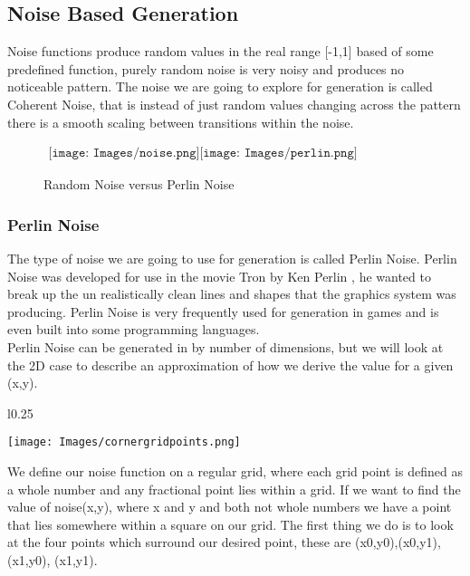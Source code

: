 \subsection{Noise Based Generation}
Noise functions produce random values in the real range [-1,1] based of some 
predefined function, purely random noise is very noisy and produces no noticeable
pattern. The noise we are going to explore for generation is called Coherent
Noise, that is instead of just random values changing across the pattern there 
is a smooth scaling between transitions within the noise.\\

\begin{figure}[h!]
	\begin{center}$
		\begin{array}{cc}
			\texttt{[image: Images/noise.png]}
			\texttt{[image: Images/perlin.png]}
		\end{array}$
	\end{center}
	\caption{Random Noise versus Perlin Noise}
\end{figure}
\newpage

\subsubsection*{Perlin Noise}
The type of noise we are going to use for generation is called Perlin Noise. 
Perlin Noise was developed for use in the movie Tron by Ken Perlin\cite{KenPerlin}
, he wanted to
break up the un realistically clean lines and shapes that the graphics system was
producing. Perlin Noise is very frequently used for generation in games and is 
even built into some programming languages.\\

Perlin Noise\cite{PerlinFAQ} can be generated in by number of dimensions, 
but we will look at the
2D case to describe an approximation of how we derive the value for a given 
(x,y).\\
\begin{wrapfigure}{l}{0.25\textwidth}
	\begin{center}
			\texttt{[image: Images/cornergridpoints.png]}
	\end{center}
\end{wrapfigure}

We define our noise function on a regular grid, where each grid point is defined as
a whole number and any fractional point lies within a grid. If we want to find the
value of noise(x,y), where x and y and both not whole numbers we have a point that
lies somewhere within a square on our grid. The first thing we do is to look at the
four points which surround our desired point, these are (x0,y0),(x0,y1),(x1,y0),
(x1,y1).\\


